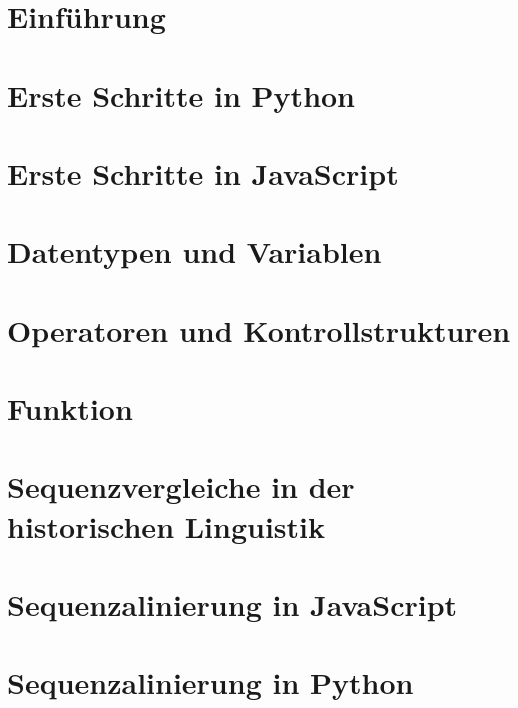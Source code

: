 \documentclass[xetex,11pt]{scrartcl}
\begin{document}
\tableofcontents
\pagebreak
\section{Einführung}

\section{Erste Schritte in Python}

\section{Erste Schritte in JavaScript}

\section{Datentypen und Variablen}

\section{Operatoren und Kontrollstrukturen}

\section{Funktion}

\section{Sequenzvergleiche in der historischen Linguistik}

\section{Sequenzalinierung in JavaScript}

\section{Sequenzalinierung in Python}

\end{document}
